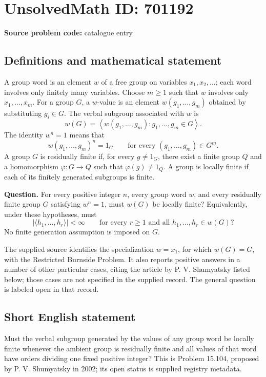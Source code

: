 \documentclass[11pt]{article}
\begin{document}
\section*{UnsolvedMath ID: 701192}
\textbf{Source problem code:} catalogue entry
\subsection{Definitions and mathematical statement}
A group word is an element \(w\) of a free group on variables \(x_1,x_2,\ldots\); each word involves only finitely many variables. Choose \(m\geq 1\) such that \(w\) involves only \(x_1,\ldots,x_m\). For a group \(G\), a \(w\)-value is an element \(w(g_1,\ldots,g_m)\) obtained by substituting \(g_i\in G\). The verbal subgroup associated with \(w\) is
\[
 w(G)=\left\langle w(g_1,\ldots,g_m):g_1,\ldots,g_m\in G\right\rangle.
\]
The identity \(w^n=1\) means that
\[
 w(g_1,\ldots,g_m)^n=1_G
 \qquad\text{for every }(g_1,\ldots,g_m)\in G^m.
\]
A group \(G\) is residually finite if, for every \(g\neq 1_G\), there exist a finite group \(Q\) and a homomorphism \(\varphi:G\to Q\) such that \(\varphi(g)\neq 1_Q\). A group is locally finite if each of its finitely generated subgroups is finite.

\textbf{Question.} For every positive integer \(n\), every group word \(w\), and every residually finite group \(G\) satisfying \(w^n=1\), must \(w(G)\) be locally finite? Equivalently, under these hypotheses, must
\[
 \bigl|\langle h_1,\ldots,h_r\rangle\bigr|<\infty
 \qquad\text{for every }r\geq 1\text{ and all }h_1,\ldots,h_r\in w(G)?
\]
No finite generation assumption is imposed on \(G\).

The supplied source identifies the specialization \(w=x_1\), for which \(w(G)=G\), with the Restricted Burnside Problem. It also reports positive answers in a number of other particular cases, citing the article by P. V. Shumyatsky listed below; those cases are not specified in the supplied record. The general question is labeled open in that record.
\subsection{Short English statement}
Must the verbal subgroup generated by the values of any group word be locally finite whenever the ambient group is residually finite and all values of that word have orders dividing one fixed positive integer? This is Problem 15.104, proposed by P. V. Shumyatsky in 2002; its open status is supplied registry metadata.
\end{document}
